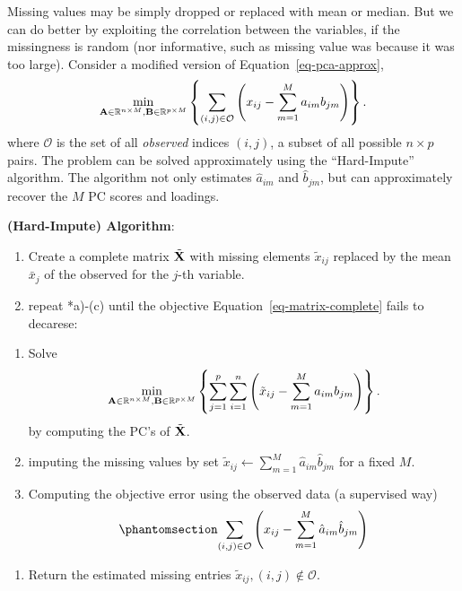 \documentclass[
  letterpaper,
  DIV=11,
  numbers=noendperiod]{scrreprt}
\providecommand{\tightlist}{%
  \setlength{\itemsep}{0pt}\setlength{\parskip}{0pt}}\usepackage{longtable,booktabs,array}
\begin{document}
Missing values may be simply dropped or replaced with mean or median.
But we can do better by exploiting the correlation between the
variables, if the missingness is random (nor informative, such as
missing value was because it was too large). Consider a modified version
of Equation~\ref{eq-pca-approx}, \[
\min_{{\bf A}\in \mathbb{R}^{n\times M}, {\bf B}\in \mathbb{R}^{p\times M}} \left\{ \sum_{(i,j)\in \mathcal{O}} \left(x_{ij} - \sum_{m=1}^M a_{im} b_{jm}   \right) \right\}.
\] where \(\mathcal{O}\) is the set of all \emph{observed} indices
\((i,j)\), a subset of all possible \(n\times p\) pairs. The problem can
be solved approximately using the ``Hard-Impute'' algorithm. The
algorithm not only estimates \(\hat{a}_{im}\) and \(\hat{b}_{jm}\), but
can approximately recover the \(M\) PC scores and loadings.

\textbf{(Hard-Impute) Algorithm}:

\begin{enumerate}
\def\labelenumi{\arabic{enumi}.}
\tightlist
\item
  Create a complete matrix \(\tilde{\bf X}\) with missing elements
  \(\tilde{x}_{ij}\) replaced by the mean \(\bar{x}_j\) of the observed
  for the \(j\)-th variable.
\item
  repeat *a)-(c) until the objective Equation~\ref{eq-matrix-complete}
  fails to decarese:
\end{enumerate}

\begin{enumerate}
\def\labelenumi{(\alph{enumi})}
\tightlist
\item
  Solve \[
  \min_{{\bf A}\in \mathbb{R}^{n\times M}, {\bf B}\in \mathbb{R}^{p\times M}} \left\{ \sum_{j=1}^p\sum_{i=1}^n \left(\tilde{x}_{ij} - \sum_{m=1}^M a_{im} b_{jm}   \right) \right\}.
  \] by computing the PC's of \(\tilde{\bf X}\).
\item
  imputing the missing values by set
  \(\tilde{x}_{ij}\leftarrow \sum_{m=1}^M \hat{a}_{im}\hat{b}_{jm}\) for
  a fixed \(M\).
\item
  Computing the objective error using the observed data (a supervised
  way) \begin{equation}\phantomsection\label{eq-matrix-complete}{
    \sum_{(i,j)\in \mathcal{O}} \left(x_{ij} - \sum_{m=1}^M \hat{a}_{im} \hat{b}_{jm}   \right)
    }\end{equation}
\end{enumerate}

\begin{enumerate}
\def\labelenumi{\arabic{enumi}.}
\setcounter{enumi}{2}
\tightlist
\item
  Return the estimated missing entries
  \(\tilde{x}_{ij}, (i,j)\notin \mathcal{O}\).
\end{enumerate}
\end{document}
